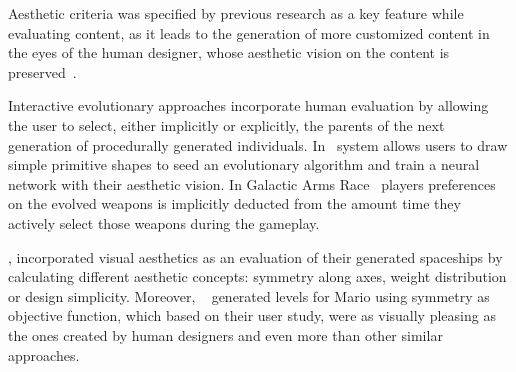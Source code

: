 Aesthetic criteria was specified by previous research as a key feature while evaluating content, as it leads to the generation of more customized content in the eyes of the human designer, whose aesthetic vision on the content is preserved~.



Interactive evolutionary approaches incorporate human evaluation by allowing the user to select, either implicitly or explicitly, the parents of the next generation of procedurally generated individuals. In~ system allows users to draw simple primitive shapes to seed an evolutionary algorithm and train a neural network with their aesthetic vision. In Galactic Arms Race~ players preferences on the evolved weapons is implicitly deducted from the amount time they actively select those weapons during the gameplay.

, incorporated visual aesthetics as an evaluation of their generated spaceships by calculating different aesthetic concepts: symmetry along axes, weight distribution or design simplicity. Moreover, ~ generated levels for Mario using symmetry as objective function, which based on their user study, were as visually pleasing as the ones created by human designers and even more than other similar approaches. 



